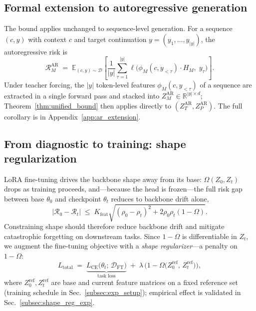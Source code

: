 \documentclass{article} %
\begin{document}
\subsection{Formal extension to autoregressive generation}
\label{subsec:ar_extension}

The bound applies unchanged to sequence-level generation. For a sequence $(c, y)$ with context $c$ and target continuation $y = (y_1, \ldots, y_{|y|})$, the autoregressive risk is
\begin{equation}
\label{eq:ar_risk}
\mathcal{R}_M^{\mathrm{AR}} \;=\; \mathbb{E}_{(c, y) \sim \mathcal{D}} \!\left[ \frac{1}{|y|} \sum_{\tau=1}^{|y|} \ell\!\big(\phi_M(c, y_{<\tau}) \cdot H_M,\; y_\tau\big) \right].
\end{equation}
Under teacher forcing, the $|y|$ token-level features $\phi_M(c, y_{<\tau})$ of a sequence are extracted in a single forward pass and stacked into $Z_M^{\mathrm{AR}} \in \mathbb{R}^{|y| \times d}$; Theorem~\ref{thm:unified_bound} then applies directly to $(Z_T^{\mathrm{AR}}, Z_P^{\mathrm{AR}})$. The full corollary is in Appendix~\ref{app:ar_extension}.


\subsection{From diagnostic to training: shape regularization}
\label{subsec:shape_reg}

LoRA fine-tuning drives the backbone shape away from its base: $\Omega(Z_0, Z_t)$ drops as training proceeds, and---because the head is frozen---the full risk gap between base $\theta_0$ and checkpoint $\theta_t$ reduces to backbone drift alone,
\begin{equation}
\label{eq:lora_bound}
|\mathcal{R}_0 - \mathcal{R}_t| \;\le\; K_{\mathrm{feat}}\sqrt{(\rho_0-\rho_t)^2 + 2\rho_0\rho_t(1-\Omega)}.
\end{equation}
Constraining shape should therefore reduce backbone drift and mitigate catastrophic forgetting on downstream tasks. Since $1 - \Omega$ is differentiable in $Z_t$, we augment the fine-tuning objective with a \emph{shape regularizer}---a penalty on $1-\Omega$:
\begin{equation}
\label{eq:shape_reg}
L_{\mathrm{total}} \;=\; \underbrace{L_{\mathrm{CE}}\bigl(\theta_t;\,\mathcal{D}_{\mathrm{FT}}\bigr)}_{\text{task loss}} \;+\; \lambda\,\bigl(1 - \Omega\!\bigl(Z_0^{\text{ref}},\, Z_t^{\text{ref}}\bigr)\bigr),
\end{equation}
where $Z_0^{\text{ref}}, Z_t^{\text{ref}}$ are base and current feature matrices on a fixed reference set (training schedule in Sec.~\ref{subsec:exp_setup}); empirical effect is validated in Sec.~\ref{subsec:shape_reg_exp}.
\end{document}
